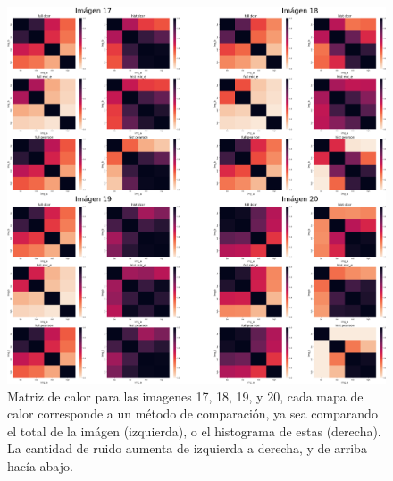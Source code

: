 \begin{figure}
    \centering
    \includegraphics[width=\textwidth]{figuras/heatmaps/heatmaps_app_4.png}
    \caption{Matriz de calor para las imagenes 17, 18, 19, y 20, cada mapa de calor corresponde a un m\'etodo de comparaci\'on, ya sea comparando el total de la im\'agen (izquierda), o el histograma de estas (derecha). La cantidad de ruido aumenta de izquierda a derecha, y de arriba hacía abajo.}
\end{figure}


